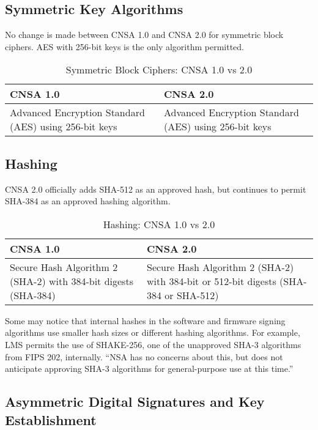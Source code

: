 \subsection{Symmetric Key Algorithms}

No change is made between CNSA 1.0 and CNSA 2.0 for symmetric block ciphers. AES with 256-bit keys is the only algorithm permitted.

\begin{table}
\begin{tabular}{|p{}|p{}|}
	\hline
	\textbf{CNSA 1.0} & \textbf{CNSA 2.0} \\
	\hline
	Advanced Encryption Standard (AES) using 256-bit keys & Advanced Encryption Standard (AES) using 256-bit keys \\
	\hline
\end{tabular}
\caption{Symmetric Block Ciphers: CNSA 1.0 vs 2.0}
\end{table}

\subsection{Hashing}

CNSA 2.0 officially adds SHA-512 as an approved hash, but continues to permit SHA-384 as an approved hashing algorithm.
\begin{table}
\begin{tabular}{|p{}|p{}|}
	\hline
	\textbf{CNSA 1.0} & \textbf{CNSA 2.0} \\
	\hline
	Secure Hash Algorithm 2 (SHA-2) with 384-bit digests (SHA-384) & Secure Hash Algorithm 2 (SHA-2) with 384-bit or 512-bit digests (SHA-384 or SHA-512) \\
	\hline
\end{tabular}
\caption{Hashing: CNSA 1.0 vs 2.0}
\end{table}

Some may notice that internal hashes in the software and firmware signing algorithms use smaller hash sizes or different hashing algorithms. For example, LMS permits the use of SHAKE-256, one of the unapproved SHA-3 algorithms from FIPS 202, internally. ``NSA has no concerns about this, but does not anticipate approving SHA-3 algorithms for general-purpose use at this time.''\autocite{20220919:cnsafaq}

\subsection{Asymmetric Digital Signatures and Key Establishment}

